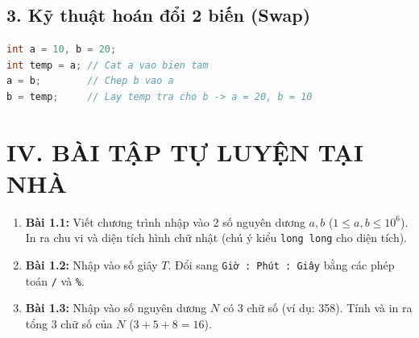 \documentclass[11pt,a4paper]{article}
\begin{document}
\subsection*{\color{AsianBlue}3. Kỹ thuật hoán đổi 2 biến (Swap)}
\begin{lstlisting}[language=C++]
int a = 10, b = 20;
int temp = a; // Cat a vao bien tam
a = b;        // Chep b vao a
b = temp;     // Lay temp tra cho b -> a = 20, b = 10
\end{lstlisting}

\section*{\color{AsianDarkBlue}IV. BÀI TẬP TỰ LUYỆN TẠI NHÀ}
\begin{enumerate}
    \setlength{\itemsep}{2pt}
    \small
    \item \textbf{Bài 1.1:} Viết chương trình nhập vào 2 số nguyên dương $a, b$ ($1 \le a, b \le 10^6$). In ra chu vi và diện tích hình chữ nhật (chú ý kiểu \texttt{long long} cho diện tích).
    \item \textbf{Bài 1.2:} Nhập vào số giây $T$. Đổi sang \texttt{Giờ : Phút : Giây} bằng các phép toán \texttt{/} và \texttt{\%}.
    \item \textbf{Bài 1.3:} Nhập vào số nguyên dương $N$ có 3 chữ số (ví dụ: 358). Tính và in ra tổng 3 chữ số của $N$ ($3 + 5 + 8 = 16$).
\end{enumerate}
\end{document}
